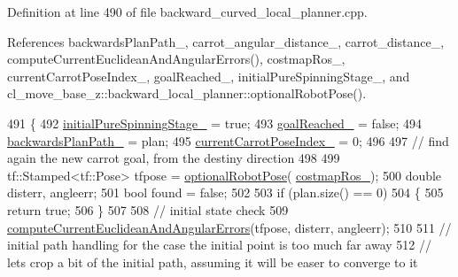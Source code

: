 Definition at line 490 of file backward\+\_\+curved\+\_\+local\+\_\+planner.\+cpp.



References backwards\+Plan\+Path\+\_\+, carrot\+\_\+angular\+\_\+distance\+\_\+, carrot\+\_\+distance\+\_\+, compute\+Current\+Euclidean\+And\+Angular\+Errors(), costmap\+Ros\+\_\+, current\+Carrot\+Pose\+Index\+\_\+, goal\+Reached\+\_\+, initial\+Pure\+Spinning\+Stage\+\_\+, and cl\+\_\+move\+\_\+base\+\_\+z\+::backward\+\_\+local\+\_\+planner\+::optional\+Robot\+Pose().


\begin{DoxyCode}
491         \{
492             \hyperlink{classcl__move__base__z_1_1backward__local__planner_1_1BackwardLocalPlanner_aa0e2b0589fce0bb228eb87751528e822}{initialPureSpinningStage\_} = \textcolor{keyword}{true};
493             \hyperlink{classcl__move__base__z_1_1backward__local__planner_1_1BackwardLocalPlanner_ad443c52ef585a8eab0364f0909222f51}{goalReached\_} = \textcolor{keyword}{false};
494             \hyperlink{classcl__move__base__z_1_1backward__local__planner_1_1BackwardLocalPlanner_ad9cde5c85f782cab2ddb4030e3c3f2cf}{backwardsPlanPath\_} = plan;
495             \hyperlink{classcl__move__base__z_1_1backward__local__planner_1_1BackwardLocalPlanner_a2e8f2b78bc97f27c5fa431f3af2261ed}{currentCarrotPoseIndex\_} = 0;
496 
497             \textcolor{comment}{// find again the new carrot goal, from the destiny direction}
498 
499             tf::Stamped<tf::Pose> tfpose = \hyperlink{namespacecl__move__base__z_1_1backward__local__planner_afd5bb2a0d144f7b89f4215fbcb1fbe69}{optionalRobotPose}(
      \hyperlink{classcl__move__base__z_1_1backward__local__planner_1_1BackwardLocalPlanner_a4136268882a105d9e06e173d85d5c0dc}{costmapRos\_});
500             \textcolor{keywordtype}{double} disterr, angleerr;
501             \textcolor{keywordtype}{bool} found = \textcolor{keyword}{false};
502 
503             \textcolor{keywordflow}{if} (plan.size() == 0)
504             \{
505                 \textcolor{keywordflow}{return} \textcolor{keyword}{true};
506             \}
507 
508             \textcolor{comment}{// initial state check}
509             \hyperlink{classcl__move__base__z_1_1backward__local__planner_1_1BackwardLocalPlanner_a843f030138afe0a28cf11a729fa67383}{computeCurrentEuclideanAndAngularErrors}(tfpose, disterr,
       angleerr);
510 
511             \textcolor{comment}{// initial path handling for the case the initial point is too much far away}
512             \textcolor{comment}{// lets crop a bit of the initial path, assuming it will be easer to converge to it}

\end{DoxyCode}
